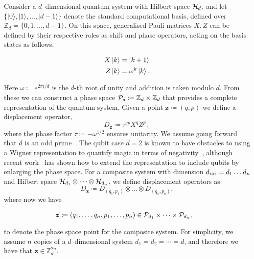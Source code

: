 \documentclass[
onecolumn,
superscriptaddress
]{revtex4-1}
\def\>{\rangle}
\def\z{\boldsymbol{z}}
\def\H{{\cal H}}
\renewcommand{\P}{{\cal P}}
\begin{document}
Consider a $d$--dimensional quantum system with Hilbert space $\H_d$, and let $\{ |0\>, |1\>, \dots , |d-1\>\}$ denote the standard computational basis, defined over $\mathbb{Z}_d = \{ 0, 1, \dots,d-1 \}$. On this space, generalised Pauli matrices $X, Z$ can be defined by their respective roles as shift and phase operators, acting on the basis states as follows,
\begin{linenomath}\begin{align}
    X \ket{k} &= \ket{k + 1} \label{eq:xpauli}\\
	Z \ket{k} &= \omega^k \ket{k}. \label{eq:zpauli}
\end{align}\end{linenomath}
Here $\omega \coloneqq e^{2\pi i/d}$ is the $d$-th root of unity and addition is taken modulo $d$. From these we can construct a phase space $\P_d \coloneqq \mathbb{Z}_d \times \mathbb{Z}_d$ that provides a complete representation of the quantum system. Given a point $\z \coloneqq (q, p)$ we define a displacement operator, 
\begin{equation}\label{eq:ddef}
    D_{\z} \coloneqq \tau^{q p} X^{q} Z^{p},\ 
\end{equation}
where the phase factor $\tau \coloneqq -\omega^{1/2}$ ensures unitarity. We assume going forward that $d$ is an odd prime~\cite{Appleby_2005}. The qubit case $d=2$ is known to have obstacles to using a Wigner representation to quantify magic in terms of negativity~\cite{Mermin_1990, cit:howard2}, although recent work~\cite{Raussendorf_qubits} has shown how to extend the representation to include qubits by enlarging the phase space. For a composite system with dimension $d_{\rm tot} = d_1 \dots d_n$ and Hilbert space $\H_{d_1} \otimes \dots \otimes \H_{d_n}$, we define displacement operators as
\begin{equation}\label{eq:composited}
    D_{\z} \coloneqq D_{(q_1, p_1)} \otimes \dots \otimes D_{(q_n, p_n)},
\end{equation}
where now we have
\begin{linenomath}\begin{align*}
	\z &\coloneqq (q_1, \dots, q_n, p_1, \dots, p_n) \in \P_{d_1} \times \dots \times \P_{d_n},
\end{align*}\end{linenomath}
to denote the phase space point for the composite system. 
For simplicity, we assume $n$ copies of a $d$--dimensional system $d_1=d_2 = \cdots = d$, and therefore we have that $\z \in \mathbb{Z}_d^{2n}$.
\end{document}
